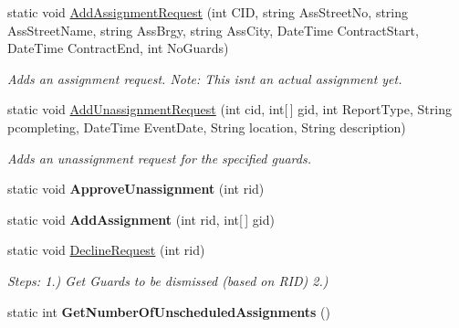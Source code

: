 \begin{DoxyCompactItemize}
static void \hyperlink{class_m_s_a_m_i_s_user_interface_1_1_scheduling_a4f78423c6f2046dde0c077c0843360cd}{Add\+Assignment\+Request} (int C\+ID, string Ass\+Street\+No, string Ass\+Street\+Name, string Ass\+Brgy, string Ass\+City, Date\+Time Contract\+Start, Date\+Time Contract\+End, int No\+Guards)
\begin{DoxyCompactList}\small\item\em Adds an assignment request. Note\+: This isn\textquotesingle{}t an actual assignment yet. \end{DoxyCompactList}\item 
static void \hyperlink{class_m_s_a_m_i_s_user_interface_1_1_scheduling_acab89a83f555666ce41f8929015c8824}{Add\+Unassignment\+Request} (int cid, int\mbox{[}$\,$\mbox{]} gid, int Report\+Type, String pcompleting, Date\+Time Event\+Date, String location, String description)
\begin{DoxyCompactList}\small\item\em Adds an unassignment request for the specified guards. \end{DoxyCompactList}\item 
\mbox{\label{class_m_s_a_m_i_s_user_interface_1_1_scheduling_a0312ba8be026668596098b838d8b4cc5}} 
static void {\bfseries Approve\+Unassignment} (int rid)
\item 
\mbox{\label{class_m_s_a_m_i_s_user_interface_1_1_scheduling_a89cdd002d12efd9cd518f16dbbbe4f29}} 
static void {\bfseries Add\+Assignment} (int rid, int\mbox{[}$\,$\mbox{]} gid)
\item 
static void \hyperlink{class_m_s_a_m_i_s_user_interface_1_1_scheduling_aad6e74ada99922ffa29580f209f429ad}{Decline\+Request} (int rid)
\begin{DoxyCompactList}\small\item\em Steps\+: 1.) Get Guards to be dismissed (based on R\+ID) 2.) \end{DoxyCompactList}\item 
\mbox{\label{class_m_s_a_m_i_s_user_interface_1_1_scheduling_a1d41feb2317fcbb036b7f0390a3ad90e}} 
static int {\bfseries Get\+Number\+Of\+Unscheduled\+Assignments} ()
\item 
\mbox{\label{class_m_s_a_m_i_s_user_interface_1_1_scheduling_a07daa5e20275fec0364c60546d3008cc}} 

\end{DoxyCompactItemize}
